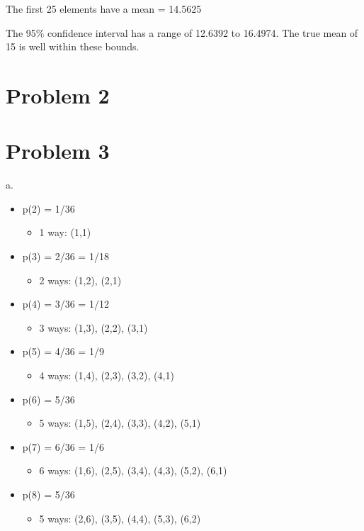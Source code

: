 \documentclass[a4paper]{article}
\begin{document}
\noindent
The first 25 elements have a mean = 14.5625

\smallskip
\noindent
The 95\% confidence interval has a range of 12.6392 to 16.4974. The true mean of 15 is well within these bounds.

\section{Problem 2}

\section{Problem 3}
a.
\begin{itemize}
    \item p(2) = 1/36
    \begin{itemize}
        \item 1 way: (1,1)
    \end{itemize}
    \item p(3) = 2/36 = 1/18
    \begin{itemize}
        \item 2 ways: (1,2), (2,1)
    \end{itemize}
    \item p(4) = 3/36 = 1/12
    \begin{itemize}
        \item 3 ways: (1,3), (2,2), (3,1)
    \end{itemize}    
    \item p(5) = 4/36 = 1/9
    \begin{itemize}
        \item 4 ways: (1,4), (2,3), (3,2), (4,1)
    \end{itemize}   
    \item p(6) = 5/36
    \begin{itemize}
        \item 5 ways: (1,5), (2,4), (3,3), (4,2), (5,1)
    \end{itemize} 
    \item p(7) = 6/36 = 1/6
    \begin{itemize}
        \item 6 ways: (1,6), (2,5), (3,4), (4,3), (5,2), (6,1)
    \end{itemize} 
    \item p(8) = 5/36
    \begin{itemize}
        \item 5 ways: (2,6), (3,5), (4,4), (5,3), (6,2)
    \end{itemize} 

\end{itemize}
\end{document}
